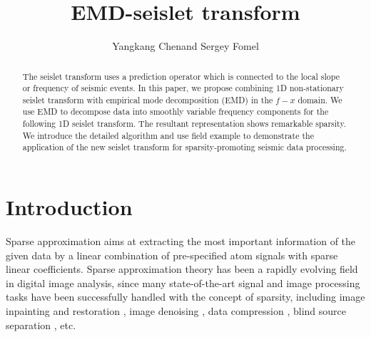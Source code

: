 
\title{EMD-seislet transform}
\renewcommand{\thefootnote}{\fnsymbol{footnote}}
\author{Yangkang Chen\footnotemark[1] and Sergey Fomel\footnotemark[2]}

\address{
\footnotemark[1]Previously: 
John A. and Katherine G. Jackson School of Geosciences \\
The University of Texas at Austin\\
University Station\\
Box X, Austin, TX 78713-8924\\
Currently: 
National Center for Computational Sciences\\
Oak Ridge National Laboratory\\
One Bethel Valley Road\\
Oak Ridge, TN 37831-6008\\
chenyk2016@gmail.com\&cheny@ornl.gov\\
\footnotemark[2]
John A. and Katherine G. Jackson School of Geosciences \\
The University of Texas at Austin\\
University Station\\
Box X, Austin, TX 78713-8924\\
sergey.fomel@beg.utexas.edu 
}

\maketitle


\begin{abstract}
The seislet transform uses a prediction operator which is connected to the local slope or frequency of seismic events. In this paper, we propose combining  1D non-stationary seislet transform with empirical mode decomposition (EMD) in the $f-x$ domain. We use  EMD to decompose data into smoothly variable frequency components for the following 1D seislet transform. The resultant representation shows remarkable sparsity.  We introduce the detailed algorithm and use  field example to demonstrate the application of the new seislet transform for sparsity-promoting seismic data processing.
\end{abstract}

\section{Introduction}
Sparse approximation aims at extracting the most important information of the given data by a linear combination of pre-specified atom signals with sparse linear coefficients. Sparse approximation theory has been a rapidly evolving field in digital image analysis, since many state-of-the-art signal and image processing tasks have been successfully handled with the concept of sparsity, including image inpainting and restoration \cite[]{elad2005,mairal2008,mairal2009,jianfeng2013}, image denoising \cite[]{protter2009,jianfeng2013}, data compression \cite[]{bryt2008}, blind source separation \cite[]{zib2001}, etc.

